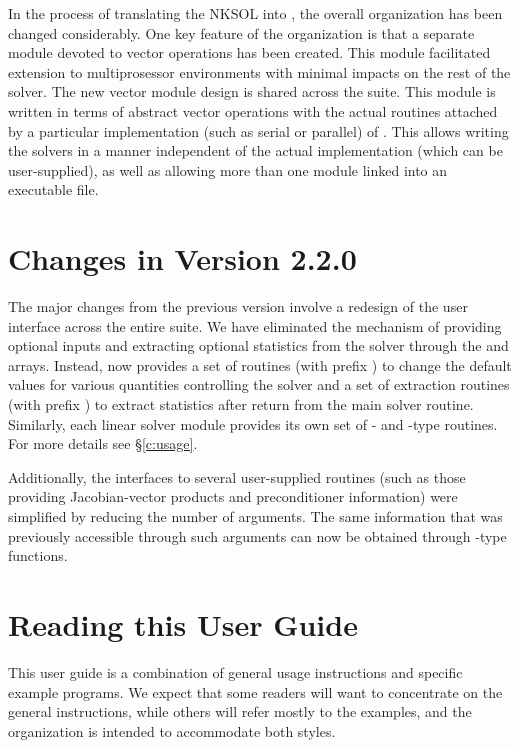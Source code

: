 In the process of translating the NKSOL into {\C}, the overall
{\kinsol} organization has been changed considerably. One key
feature of the {\kinsol} organization is that a separate module
devoted to vector operations has been created.  This module
facilitated extension to multiprosessor environments with minimal
impacts on the rest of the solver. The new vector module design is
shared across the {\sundials} suite. This {\nvector} module is
written in terms of abstract vector operations with the actual
routines attached by a particular implementation (such as serial
or parallel) of {\nvector}. This allows writing the {\sundials}
solvers in a manner independent of the actual {\nvector}
implementation (which can be user-supplied), as well as allowing
more than one {\nvector} module linked into an executable file.

\section{Changes in Version 2.2.0}
The major changes from the previous version involve a redesign of
the user interface across the entire {\sundials} suite. We have
eliminated the mechanism of providing optional inputs and
extracting optional statistics from the solver through the
 and  arrays. Instead, {\kinsol} now provides a
set of routines (with prefix ) to change the default
values for various quantities controlling the solver and a set of
extraction routines (with prefix ) to extract
statistics after return from the main solver routine. Similarly,
each linear solver module provides its own set of {-} and
{-type} routines. For more details see \S\ref{c:usage}.

Additionally, the interfaces to several user-supplied routines
(such as those providing Jacobian-vector products and
preconditioner information) were simplified by reducing the number
of arguments. The same information that was previously accessible
through such arguments can now be obtained through {-type}
functions.

\section{Reading this User Guide}\label{ss:reading}

This user guide is a combination of general usage instructions and
specific example programs.  We expect that some readers will want to
concentrate on the general instructions, while others will refer
mostly to the examples, and the organization is intended to
accommodate both styles.


